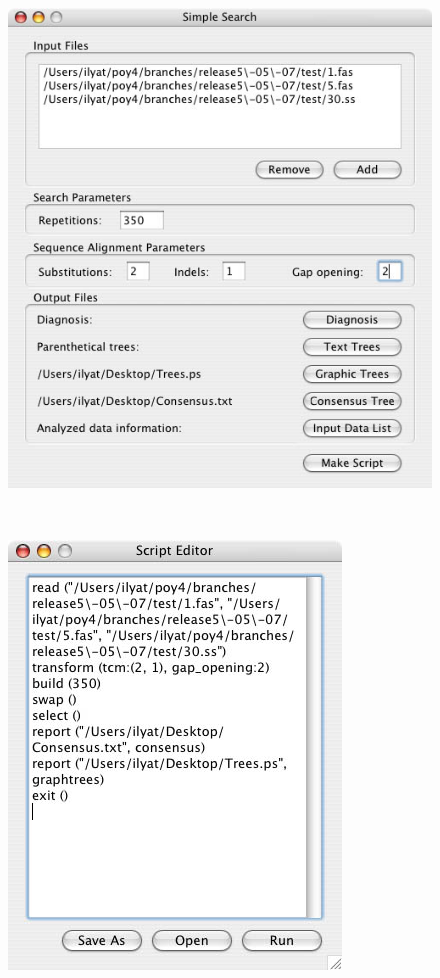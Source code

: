 \begin{figure}
\centering
\begin{minipage}[c]{0.45\textwidth}
   		\includegraphics[width=\textwidth]{doc/figures/simplesearch_window_filled.jpg}
\end{minipage}
\,
\begin{minipage}[c]{0.52\textwidth}
	   	\includegraphics[width=\textwidth]{doc/figures/simplesearch_script.jpg}

\end{minipage}
\end{figure}
